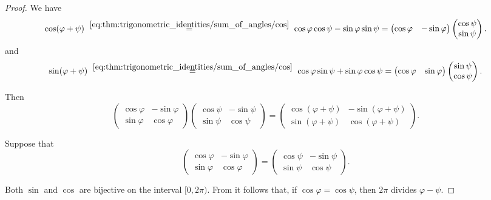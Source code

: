 \begin{proof}
   We have
  \begin{equation*}
    \cos(\varphi + \psi)
    \reloset {\eqref{eq:thm:trigonometric_identities/sum_of_angles/cos}} =
    \cos \varphi \cos \psi - \sin \varphi \sin \psi
    =
    \begin{pmatrix}
      \cos \varphi & -\sin \varphi
    \end{pmatrix}
    \begin{pmatrix}
      \cos \psi \\ \sin \psi
    \end{pmatrix}.
  \end{equation*}
  and
  \begin{equation*}
    \sin(\varphi + \psi)
    \reloset {\eqref{eq:thm:trigonometric_identities/sum_of_angles/cos}} =
    \cos \varphi \sin \psi + \sin \varphi \cos \psi
    =
    \begin{pmatrix}
      \cos \varphi & \sin \varphi
    \end{pmatrix}
    \begin{pmatrix}
      \sin \psi \\ \cos \psi
    \end{pmatrix}.
  \end{equation*}

  Then
  \begin{equation*}
    \begin{pmatrix}
      \cos \varphi & -\sin \varphi \\
      \sin \varphi & \cos \varphi
    \end{pmatrix}
    \begin{pmatrix}
      \cos \psi & -\sin \psi \\
      \sin \psi & \cos \psi
    \end{pmatrix}
    =
    \begin{pmatrix}
      \cos (\varphi + \psi) & -\sin (\varphi + \psi) \\
      \sin (\varphi + \psi) & \cos (\varphi + \psi)
    \end{pmatrix}.
  \end{equation*}

   Suppose that
  \begin{equation*}
    \begin{pmatrix}
      \cos \varphi & -\sin \varphi \\
      \sin \varphi & \cos \varphi
    \end{pmatrix}
    =
    \begin{pmatrix}
      \cos \psi & -\sin \psi \\
      \sin \psi & \cos \psi
    \end{pmatrix}.
  \end{equation*}

  Both \( \sin \) and \( \cos \) are bijective on the interval \( [0, 2\pi) \). From  it follows that, if \( \cos \varphi = \cos \psi \), then \( 2\pi \) divides \( \varphi - \psi \).
\end{proof}

